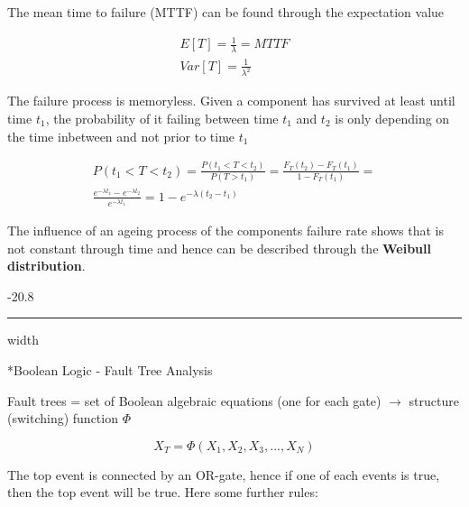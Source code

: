\documentclass[8pt, landscape, fleqn]{scrartcl}
\makeatletter
\renewcommand{\subsubsection}{\@startsection{subsubsection}{1}{0mm}%
{-2\baselineskip}{0.8\baselineskip}%
{\hrule depth 0.2pt width\columnwidth\vspace*{1.2em}\normalsize\bfseries\rmfamily}}
\makeatother
\begin{document}
\begin{multicols*}{3}
 The mean time to failure (MTTF) can be found through the expectation value

 \begin{align}
     E[T] = \frac{1}{\lambda} = MTTF \\
     Var[T] = \frac{1}{\lambda^2}
 \end{align}

 The failure process is memoryless. Given a component has survived at least until time $t_1$, the probability of it failing between time $t_1$ and $t_2$ is only depending on the time inbetween and not prior to time $t_1$

 \begin{align}
     P(t_1 < T < t_2) = \frac{P(t_1 < T < t_2)}{P(T > t_1)} = \frac{F_T(t_2)-F_T(t_1)}{1-F_T(t_1)} = \\
     \frac{e^{-\lambda t_1}-e^{-\lambda t_2}}{e^{-\lambda t_1}} = 1-e^{-\lambda(t_2-t_1)}
 \end{align}

The influence of an ageing process of the components failure rate shows that is not constant through time and hence can be described through the \textbf{Weibull distribution}. 

\subsubsection*{Boolean Logic - Fault Tree Analysis}

Fault trees = set of Boolean algebraic equations (one for each gate) $\rightarrow$ structure (switching) function $\Phi$

\begin{equation}
    X_T = \Phi(X_1,X_2,X_3,...,X_N)
\end{equation}

The top event is connected by an OR-gate, hence if one of each events is true, then the top event will be true. Here some further rules:


\end{multicols*}
\end{document}
